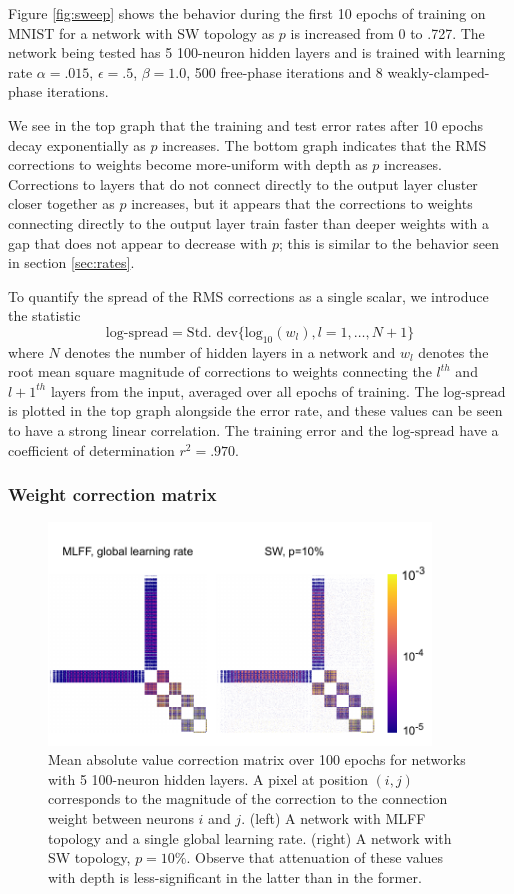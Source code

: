 \documentclass[utf8]{frontiersSCNS}
\begin{document}
Figure \ref{fig:sweep} shows the behavior during the first 10 epochs of training on MNIST for a network with SW topology as $p$ is increased from 0 to .727. The network being tested has 5 100-neuron hidden layers and is trained with learning rate $\alpha=.015$, $\epsilon=.5$, $\beta=1.0$, 500 free-phase iterations and 8 weakly-clamped-phase iterations.

We see in the top graph that the training and test error rates after 10 epochs decay exponentially as $p$ increases. The bottom graph indicates that the RMS corrections to weights become more-uniform with depth as $p$ increases. Corrections to layers that do not connect directly to the output layer cluster closer together as $p$ increases, but it appears that the corrections to weights connecting directly to the output layer train faster than deeper weights with a gap that does not appear to decrease with $p$; this is similar to the behavior seen in section \ref{sec:rates}.

To quantify the spread of the RMS corrections as a single scalar, we introduce the statistic
\begin{equation}
\label{eqn:spread}
	\text{log-spread} = \text{Std. dev}\{\text{log}_{10}(w_l), l=1,\hdots,N+1\}
\end{equation}
where $N$ denotes the number of hidden layers in a network and $w_l$ denotes the root mean square magnitude of corrections to weights connecting the $l^{th}$ and $l+1^{th}$ layers from the input, averaged over all epochs of training. The $\text{log-spread}$ is plotted in the top graph alongside the error rate, and these values can be seen to have a strong linear correlation. The training error and the $\text{log-spread}$ have a coefficient of determination $r^2=.970$.


\subsubsection{Weight correction matrix}
\begin{figure}
	\centering
	\includegraphics[width=4in]{figures/matrix_image.pdf}
	\caption{Mean absolute value correction matrix over 100 epochs for networks with 5 100-neuron hidden layers. A pixel at position $(i, j)$ corresponds to the magnitude of the correction to the connection weight between neurons $i$ and $j$. (left) A network with MLFF topology and a single global learning rate. (right) A network with SW topology, $p=10\%$. Observe that attenuation of these values with depth is less-significant in the latter than in the former.}
	\label{fig:matrices}
\end{figure}
\end{document}
